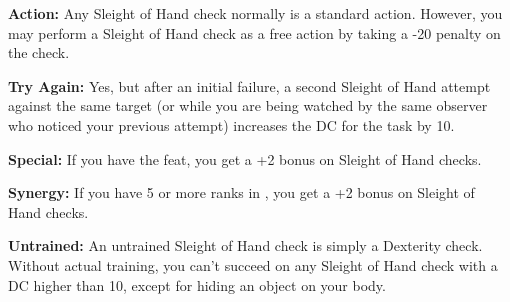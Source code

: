 \textbf{Action:} Any Sleight of Hand check normally is a standard action. However, 
you may perform a Sleight of Hand check as a free action by taking a -20 penalty 
on the check.

\textbf{Try Again:} Yes, but after an initial failure, a second Sleight of Hand 
attempt against the same target (or while you are being watched by the same observer 
who noticed your previous attempt) increases the DC for the task by 10.

\textbf{Special:} If you have the  feat, you get a +2 bonus on Sleight 
of Hand checks.

\textbf{Synergy:} If you have 5 or more ranks in , you get a +2 bonus on Sleight 
of Hand checks.

\textbf{Untrained:} An untrained Sleight of Hand check is simply a Dexterity check. 
Without actual training, you can't succeed on any Sleight of Hand check with a 
DC higher than 10, except for hiding an object on your body.
